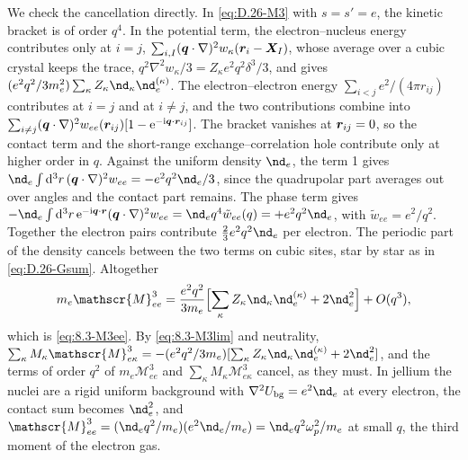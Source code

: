 We check the cancellation directly. In \cref{eq:D.26-M3} with $s = s' = e$, the kinetic bracket is of order $q^4$. In the potential term, the electron--nucleus energy contributes only at $i = j$, $\sum_{i,I}(\bm{q}\cdot\nabla)^2w_\kappa(\bm{r}_i - \bm{X}_I)$, whose average over a cubic crystal keeps the trace, $q^2\nabla^2w_\kappa/3 = Z_\kappa e^2q^2\delta^3/3$, and gives $(e^2q^2/3m_e^2)\sum_\kappa Z_\kappa\nd_\kappa\nd_e^{(\kappa)}$. The electron--electron energy $\sum_{i<j}e^2/(4\pi r_{ij})$ contributes at $i = j$ and at $i \neq j$, and the two contributions combine into $\sum_{i\neq j}(\bm{q}\cdot\nabla)^2w_{ee}(\bm{r}_{ij})[1 - \mathrm{e}^{-\mathrm{i}\bm{q}\cdot\bm{r}_{ij}}]$. The bracket vanishes at $\bm{r}_{ij} = 0$, so the contact term and the short-range exchange--correlation hole contribute only at higher order in $q$. Against the uniform density $\nd_e$, the term 1 gives $\nd_e\int\dd^3r\,(\vect{q}\cdot\nabla)^2w_{ee} = -e^2q^2\nd_e/3$, since the quadrupolar part averages out over angles and the contact part remains. The phase term gives $-\nd_e\int\dd^3r\,\ee^{-\ii\vect{q}\cdot\vect{r}}(\vect{q}\cdot\nabla)^2w_{ee} = \nd_eq^4\tilde w_{ee}(q) = +e^2q^2\nd_e$, with $\tilde w_{ee} = e^2/q^2$. Together the electron pairs contribute $\frac23e^2q^2\nd_e$ per electron. The periodic part of the density cancels between the two terms on cubic sites, star by star as in \cref{eq:D.26-Gsum}. Altogether
\begin{equation*}
  m_e\mathscr{M}^3_{ee} = \frac{e^2q^2}{3m_e}\Bigl[\sum_\kappa Z_\kappa\nd_\kappa\nd_e^{(\kappa)} + 2\nd_e^2\Bigr] + O(q^3) ,
\end{equation*}
which is \cref{eq:8.3-M3ee}. By \cref{eq:8.3-M3lim} and neutrality, $\sum_\kappa M_\kappa\mathscr{M}^3_{e\kappa} = -(e^2q^2/3m_e)[\sum_\kappa Z_\kappa\nd_\kappa\nd_e^{(\kappa)} + 2\nd_e^2]$, and the terms of order $q^2$ of $m_e\mathscr{M}^3_{ee}$ and $\sum_\kappa M_\kappa\mathscr{M}^3_{e\kappa}$ cancel, as they must. In jellium the nuclei are a rigid uniform background with $\nabla^2U_{\mathrm{bg}} = e^2\nd_e$ at every electron, the contact sum becomes $\nd_e^2$, and $\mathscr{M}^3_{ee} = (\nd_eq^2/m_e)(e^2\nd_e/m_e) = \nd_eq^2\omega_p^2/m_e$ at small $q$, the third moment of the electron gas.

